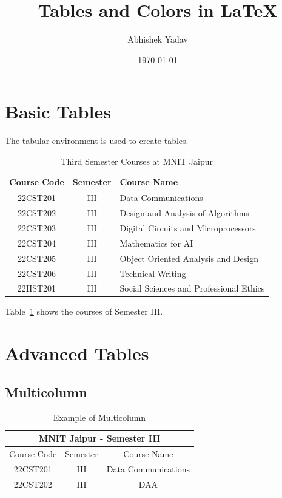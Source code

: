\documentclass{article}
\title{Tables and Colors in LaTeX}
\author{Abhishek Yadav}
\date{\today}
\begin{document}
\maketitle

\section{Basic Tables}

The tabular environment is used to create tables.

\begin{table}[h!]
    \centering
    \begin{tabular}{|c|c|l|}
        \hline
        \textbf{Course Code} & \textbf{Semester} & \textbf{Course Name} \\
        \hline
        22CST201 & III & Data Communications \\
        22CST202 & III & Design and Analysis of Algorithms \\
        22CST203 & III & Digital Circuits and Microprocessors \\
        22CST204 & III & Mathematics for AI \\
        22CST205 & III & Object Oriented Analysis and Design \\
        22CST206 & III & Technical Writing \\
        22HST201 & III & Social Sciences and Professional Ethics \\
        \hline
    \end{tabular}
    \caption{Third Semester Courses at MNIT Jaipur}
    \label{tab:courses}
\end{table}

Table~\ref{tab:courses} shows the courses of Semester III.

\section{Advanced Tables}

\subsection{Multicolumn}

\begin{table}[h!]
    \centering
    \begin{tabular}{|c|c|c|}
        \hline
        \multicolumn{3}{|c|}{\textbf{MNIT Jaipur - Semester III}} \\
        \hline
        Course Code & Semester & Course Name \\
        \hline
        22CST201 & III & Data Communications \\
        22CST202 & III & DAA \\
        \hline
    \end{tabular}
    \caption{Example of Multicolumn}
\end{table}
\end{document}
